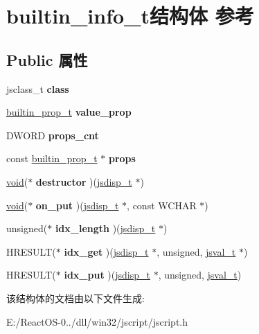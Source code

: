 \hypertarget{structbuiltin__info__t}{}\section{builtin\+\_\+info\+\_\+t结构体 参考}
\label{structbuiltin__info__t}
\subsection*{Public 属性}
\begin{DoxyCompactItemize}
\item 
\mbox{\label{structbuiltin__info__t_ad4a41e402b62392ad73515f38eb66b65}} 
jsclass\+\_\+t {\bfseries class}
\item 
\mbox{\label{structbuiltin__info__t_a55484c41161fa6757e6bfc9401de016c}} 
\hyperlink{structbuiltin__prop__t}{builtin\+\_\+prop\+\_\+t} {\bfseries value\+\_\+prop}
\item 
\mbox{\label{structbuiltin__info__t_a8a8853488bf2d4d5e8d9ef46a9e51b93}} 
D\+W\+O\+RD {\bfseries props\+\_\+cnt}
\item 
\mbox{\label{structbuiltin__info__t_a51d102214e927c7116527c8f099a32ef}} 
const \hyperlink{structbuiltin__prop__t}{builtin\+\_\+prop\+\_\+t} $\ast$ {\bfseries props}
\item 
\mbox{\label{structbuiltin__info__t_a1dc3c51cb1a4fe3da061afa52a768b71}} 
\hyperlink{interfacevoid}{void}($\ast$ {\bfseries destructor} )(\hyperlink{structjsdisp__t}{jsdisp\+\_\+t} $\ast$)
\item 
\mbox{\label{structbuiltin__info__t_aede04045ae74d9c3809ef10de761b85b}} 
\hyperlink{interfacevoid}{void}($\ast$ {\bfseries on\+\_\+put} )(\hyperlink{structjsdisp__t}{jsdisp\+\_\+t} $\ast$, const W\+C\+H\+AR $\ast$)
\item 
\mbox{\label{structbuiltin__info__t_a4768c8a5d26c6fc72c1bb60194665664}} 
unsigned($\ast$ {\bfseries idx\+\_\+length} )(\hyperlink{structjsdisp__t}{jsdisp\+\_\+t} $\ast$)
\item 
\mbox{\label{structbuiltin__info__t_adc9af06aed2e6ab89d1456013146faa3}} 
H\+R\+E\+S\+U\+LT($\ast$ {\bfseries idx\+\_\+get} )(\hyperlink{structjsdisp__t}{jsdisp\+\_\+t} $\ast$, unsigned, \hyperlink{struct__jsval__t}{jsval\+\_\+t} $\ast$)
\item 
\mbox{\label{structbuiltin__info__t_ab9f561c47d185bf948628ed5357ee966}} 
H\+R\+E\+S\+U\+LT($\ast$ {\bfseries idx\+\_\+put} )(\hyperlink{structjsdisp__t}{jsdisp\+\_\+t} $\ast$, unsigned, \hyperlink{struct__jsval__t}{jsval\+\_\+t})
\end{DoxyCompactItemize}


该结构体的文档由以下文件生成\+:\begin{DoxyCompactItemize}
\item 
E\+:/\+React\+O\+S-\/0../dll/win32/jscript/jscript.\+h\end{DoxyCompactItemize}
